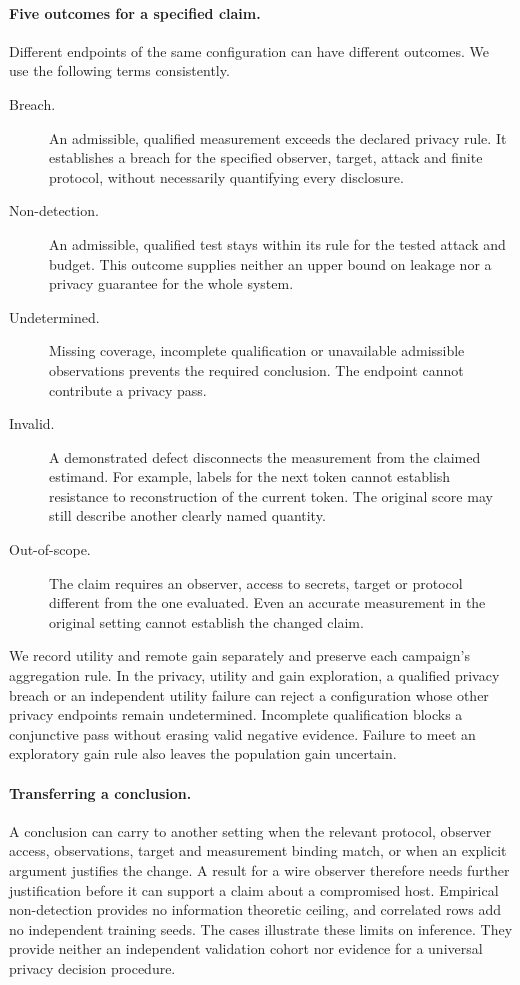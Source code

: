 \paragraph{Five outcomes for a specified claim.}
Different endpoints of the same configuration can have different
outcomes. We use the following terms consistently.
\begin{description}
  \item[Breach.] An admissible, qualified measurement exceeds the
    declared privacy rule. It establishes a breach for the specified
    observer, target, attack and finite protocol, without necessarily
    quantifying every disclosure.
  \item[Non-detection.] An admissible, qualified test stays within its
    rule for the tested attack and budget. This outcome supplies neither
    an upper bound on leakage nor a privacy guarantee for the whole system.
  \item[Undetermined.] Missing coverage, incomplete qualification or
    unavailable admissible observations prevents the required conclusion.
    The endpoint cannot contribute a privacy pass.
  \item[Invalid.] A demonstrated defect disconnects the measurement from
    the claimed estimand. For example, labels for the next token cannot
    establish resistance to reconstruction of the current token. The
    original score may still describe another clearly named quantity.
  \item[Out-of-scope.] The claim requires an observer, access to secrets,
    target or protocol different from the one evaluated. Even an accurate
    measurement in the original setting cannot establish the changed claim.
\end{description}

We record utility and remote gain separately and preserve each campaign's
aggregation rule. In the privacy, utility and gain exploration, a qualified
privacy breach or an independent utility failure can reject a configuration
whose other privacy endpoints remain undetermined. Incomplete qualification
blocks a conjunctive pass without erasing valid negative evidence. Failure
to meet an exploratory gain rule also leaves the population gain uncertain.

\paragraph{Transferring a conclusion.}
A conclusion can carry to another setting when the relevant protocol,
observer access, observations, target and measurement binding match, or
when an explicit argument justifies the change. A result for a wire
observer therefore needs further justification before it can support a
claim about a compromised host. Empirical non-detection provides no
information theoretic ceiling, and correlated rows add no independent
training seeds. The cases illustrate these limits on inference. They
provide neither an independent validation cohort nor evidence for a
universal privacy decision procedure.
